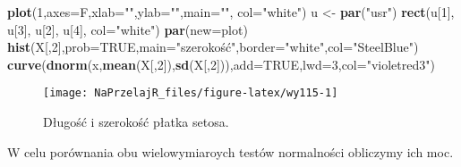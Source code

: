 \documentclass[polish,]{book}
\newenvironment{Shaded}{\begin{snugshade}}{\end{snugshade}}
\newcommand{\DataTypeTok}[1]{\textcolor[rgb]{0.13,0.29,0.53}{#1}}
\newcommand{\DecValTok}[1]{\textcolor[rgb]{0.00,0.00,0.81}{#1}}
\newcommand{\KeywordTok}[1]{\textcolor[rgb]{0.13,0.29,0.53}{\textbf{#1}}}
\newcommand{\NormalTok}[1]{#1}
\newcommand{\OtherTok}[1]{\textcolor[rgb]{0.56,0.35,0.01}{#1}}
\newcommand{\StringTok}[1]{\textcolor[rgb]{0.31,0.60,0.02}{#1}}
\begin{document}
\begin{Shaded}
\begin{Highlighting}[]
\KeywordTok{plot}\NormalTok{(}\DecValTok{1}\NormalTok{,}\DataTypeTok{axes=}\NormalTok{F,}\DataTypeTok{xlab=}\StringTok{""}\NormalTok{,}\DataTypeTok{ylab=}\StringTok{""}\NormalTok{,}\DataTypeTok{main=}\StringTok{""}\NormalTok{, }\DataTypeTok{col=}\StringTok{"white"}\NormalTok{)}
\NormalTok{u <-}\StringTok{ }\KeywordTok{par}\NormalTok{(}\StringTok{"usr"}\NormalTok{)}
\KeywordTok{rect}\NormalTok{(u[}\DecValTok{1}\NormalTok{], u[}\DecValTok{3}\NormalTok{], u[}\DecValTok{2}\NormalTok{], u[}\DecValTok{4}\NormalTok{], }\DataTypeTok{col=}\StringTok{"white"}\NormalTok{)}
\KeywordTok{par}\NormalTok{(}\DataTypeTok{new=}\NormalTok{plot)}
\KeywordTok{hist}\NormalTok{(X[,}\DecValTok{2}\NormalTok{],}\DataTypeTok{prob=}\OtherTok{TRUE}\NormalTok{,}\DataTypeTok{main=}\StringTok{"szerokość"}\NormalTok{,}\DataTypeTok{border=}\StringTok{"white"}\NormalTok{,}\DataTypeTok{col=}\StringTok{"SteelBlue"}\NormalTok{)}
\KeywordTok{curve}\NormalTok{(}\KeywordTok{dnorm}\NormalTok{(x,}\KeywordTok{mean}\NormalTok{(X[,}\DecValTok{2}\NormalTok{]),}\KeywordTok{sd}\NormalTok{(X[,}\DecValTok{2}\NormalTok{])),}\DataTypeTok{add=}\OtherTok{TRUE}\NormalTok{,}\DataTypeTok{lwd=}\DecValTok{3}\NormalTok{,}\DataTypeTok{col=}\StringTok{"violetred3"}\NormalTok{)}
\end{Highlighting}
\end{Shaded}

\begin{figure}[h]

{\centering \texttt{[image: NaPrzelajR\_files/figure-latex/wy115-1]} 

}

\caption{Długość i szerokość płatka setosa.}\label{fig:wy115}
\end{figure}

W celu porównania obu wielowymiaroych testów normalności obliczymy ich moc.
\end{document}
